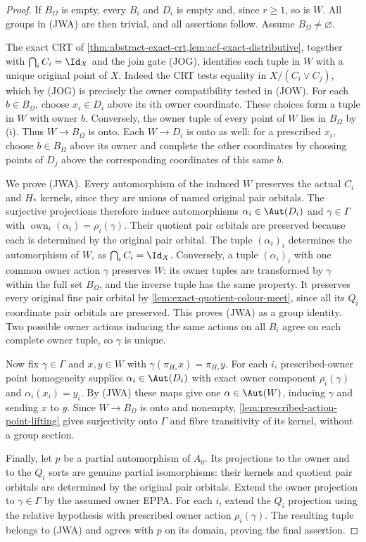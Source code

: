 \begin{proof}
If $B_\Omega$ is empty, every $B_i$ and $D_i$ is empty and,
since $r\ge1$, so is $W$. All groups in (JWA) are then trivial,
and all assertions follow. Assume $B_\Omega\ne\varnothing$.

The exact CRT of \cref{thm:abstract-exact-crt,lem:acf-exact-distributive},
together with $\bigcap_iC_i=\Id_X$ and the join gate (JOG),
identifies each tuple in $W$ with a unique original point of $X$.
Indeed the CRT tests equality in $X/(C_i\vee C_j)$, which by
(JOG) is precisely the owner compatibility tested in (JOW).
For each $b\in B_\Omega$, choose $x_i\in D_i$ above its $i$th
owner coordinate. These choices form a tuple in $W$ with owner
$b$. Conversely, the owner tuple of every point of $W$ lies in
$B_\Omega$ by (i). Thus $W\to B_\Omega$ is onto.
Each $W\to D_i$ is onto as well: for a prescribed $x_i$, choose
$b\in B_\Omega$ above its owner and complete the other coordinates
by choosing points of $D_j$ above the corresponding coordinates
of this same $b$.

We prove (JWA). Every automorphism of the induced $W$ preserves
the actual $C_i$ and $H_*$ kernels, since they are unions of named
original pair orbitals. The surjective projections therefore
induce automorphisms $\alpha_i\in\Aut(D_i)$ and
$\gamma\in\Gamma$ with
$\operatorname{own}_i(\alpha_i)=\rho_i(\gamma)$.
Their quotient pair orbitals are preserved because each is
determined by the original pair orbital. The tuple
$(\alpha_i)_i$ determines the automorphism of $W$, as
$\bigcap_iC_i=\Id_X$.
Conversely, a tuple $(\alpha_i)_i$ with one common owner action
$\gamma$ preserves $W$: its owner tuples are transformed by
$\gamma$ within the full set $B_\Omega$, and the inverse tuple
has the same property. It preserves every original fine pair
orbital by \cref{lem:exact-quotient-colour-meet}, since all its
$Q_i$ coordinate pair orbitals are preserved. This proves (JWA)
as a group identity. Two possible owner actions inducing the
same actions on all $B_i$ agree on each complete owner tuple,
so $\gamma$ is unique.

Now fix $\gamma\in\Gamma$ and $x,y\in W$ with
$\gamma(\pi_{H_*}x)=\pi_{H_*}y$. For each $i$,
prescribed-owner point homogeneity supplies
$\alpha_i\in\Aut(D_i)$ with exact owner component
$\rho_i(\gamma)$ and $\alpha_i(x_i)=y_i$.
By (JWA) these maps give one $\alpha\in\Aut(W)$, inducing
$\gamma$ and sending $x$ to $y$. Since $W\to B_\Omega$ is onto and nonempty,
\cref{lem:prescribed-action-point-lifting} gives surjectivity onto
$\Gamma$ and fibre transitivity of its kernel, without a group section.

Finally, let $p$ be a partial automorphism of $A_0$.
Its projections to the owner and to the $Q_i$ sorts are genuine
partial isomorphisms: their kernels and quotient pair orbitals
are determined by the original pair orbitals. Extend the owner
projection to $\gamma\in\Gamma$ by the assumed owner EPPA.
For each $i$, extend the $Q_i$ projection using the relative
hypothesis with prescribed owner action $\rho_i(\gamma)$.
The resulting tuple belongs to (JWA) and agrees with $p$ on
its domain, proving the final assertion.
\end{proof}

